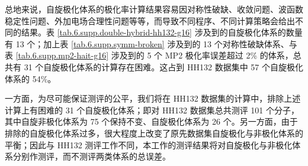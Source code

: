 总地来说，自旋极化体系的极化率计算结果容易因对称性破缺、收敛问题、波函数稳定性问题、外加电场合理性问题等等，而导致不同程序、不同计算策略会给出不同的结果。表 \ref{tab.6.supp.double-hybrid-hh132-g16} 涉及到的自旋极化体系的数量有 13 个；加上表 \ref{tab.6.supp.symm-broken} 涉及到的 13 个对称性破缺体系、与表 \ref{tab.6.supp.mp2-hait-g16} 涉及到的 5 个 MP2 极化率误差超过 2\% 的体系，总共有 31 个自旋极化体系的计算存在困难。这占到 HH132 数据集中 57 个自旋极化体系的 54\%。

一方面，为尽可能保证测评的公平，我们将在 HH132 数据集的计算中，排除上述计算上有困难的 31 个自旋极化体系；即对 HH132 数据集总共测评 101 个分子，其中自旋非极化体系为 75 个保持不变、自旋极化体系为 26 个。另一方面，由于排除的自旋极化体系过多，很大程度上改变了原先数据集自旋极化与非极化体系的平衡；因此与 HH132 测评工作\cite{Hait-Head-Gordon.PCCP.2018}不同，本工作的测评结果将对自旋极化与非极化体系分别作测评，而不测评两类体系的总误差。

\newpage




